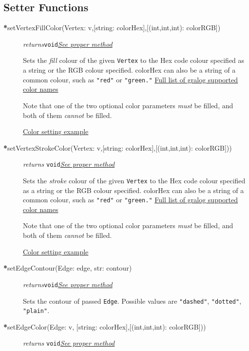 \documentclass{article}
\newcounter{example}
\newlength\q
\begin{document}
\subsection{Setter Functions}
\begin{description}
\item[\textbf{*}setVertexFillColor(Vertex: v,{[string: colorHex]},{[(int,int,int): colorRGB]})]\emph{returns}\texttt{void}\quad \hyperref[setVertexFillColorClass]{\textit{See proper method}}

Sets the \textit{fill} colour of the given \texttt{Vertex} to the Hex code colour
specified as a string or the RGB colour specified. colorHex can also be
a string of a common colour, such as \texttt{"red"} or
\texttt{"green."} \hyperref[colorNamesSupportedByGralog]{Full list of gralog supported color names}

Note that one of the two optional color parameters \textit{must} be filled, and both of them \textit{cannot} be filled.

\hyperref[colorNamesSupportedByGralog]{Color setting example}

\item[\textbf{*}setVertexStrokeColor(Vertex: v,{[string: colorHex]},{[(int,int,int): colorRGB]}))] \emph{returns} \texttt{void}\quad \hyperref[setVertexStrokeColorClass]{\textit{See proper method}}

Sets the \textit{stroke} colour of the given \texttt{Vertex} to the Hex code colour
specified as a string or the RGB colour specified. colorHex can also be
a string of a common colour, such as \texttt{"red"} or
\texttt{"green."} \hyperref[colorNamesSupportedByGralog]{Full list of gralog supported color names}

Note that one of the two optional color parameters \textit{must} be filled, and both of them \textit{cannot} be filled.

\hyperref[colorNamesSupportedByGralog]{Color setting example}

\item[\textbf{*}setEdgeContour(Edge: edge, str: contour)] \emph{returns}\texttt{void}\quad \hyperref[setEdgeContourClass]{\textit{See proper method}}

Sets the contour of passed \texttt{Edge}. Possible values are
\texttt{"dashed"}, \texttt{"dotted"}, \texttt{"plain"}.

\item[\textbf{*}setEdgeColor(Edge: v, {[string: colorHex]},{[(int,int,int): colorRGB]}))] \emph{returns} \texttt{void}\quad \hyperref[setEdgeColorClass]{\textit{See proper method}}


\end{description}
\end{document}
